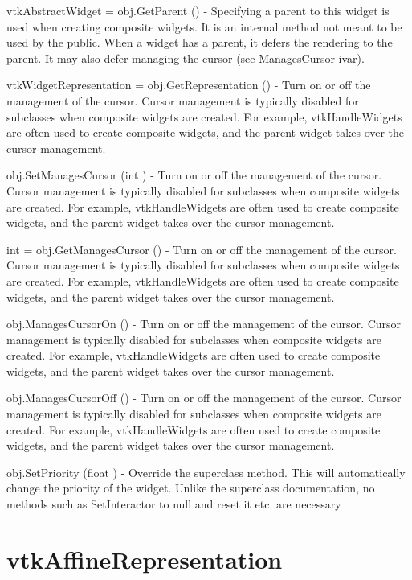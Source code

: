 \begin{DoxyItemize}
\item {\ttfamily vtk\-Abstract\-Widget = obj.\-Get\-Parent ()} -\/ Specifying a parent to this widget is used when creating composite widgets. It is an internal method not meant to be used by the public. When a widget has a parent, it defers the rendering to the parent. It may also defer managing the cursor (see Manages\-Cursor ivar).  
\item {\ttfamily vtk\-Widget\-Representation = obj.\-Get\-Representation ()} -\/ Turn on or off the management of the cursor. Cursor management is typically disabled for subclasses when composite widgets are created. For example, vtk\-Handle\-Widgets are often used to create composite widgets, and the parent widget takes over the cursor management.  
\item {\ttfamily obj.\-Set\-Manages\-Cursor (int )} -\/ Turn on or off the management of the cursor. Cursor management is typically disabled for subclasses when composite widgets are created. For example, vtk\-Handle\-Widgets are often used to create composite widgets, and the parent widget takes over the cursor management.  
\item {\ttfamily int = obj.\-Get\-Manages\-Cursor ()} -\/ Turn on or off the management of the cursor. Cursor management is typically disabled for subclasses when composite widgets are created. For example, vtk\-Handle\-Widgets are often used to create composite widgets, and the parent widget takes over the cursor management.  
\item {\ttfamily obj.\-Manages\-Cursor\-On ()} -\/ Turn on or off the management of the cursor. Cursor management is typically disabled for subclasses when composite widgets are created. For example, vtk\-Handle\-Widgets are often used to create composite widgets, and the parent widget takes over the cursor management.  
\item {\ttfamily obj.\-Manages\-Cursor\-Off ()} -\/ Turn on or off the management of the cursor. Cursor management is typically disabled for subclasses when composite widgets are created. For example, vtk\-Handle\-Widgets are often used to create composite widgets, and the parent widget takes over the cursor management.  
\item {\ttfamily obj.\-Set\-Priority (float )} -\/ Override the superclass method. This will automatically change the priority of the widget. Unlike the superclass documentation, no methods such as Set\-Interactor to null and reset it etc. are necessary  
\end{DoxyItemize}\hypertarget{vtkwidgets_vtkaffinerepresentation}{}\section{vtk\-Affine\-Representation}\label{vtkwidgets_vtkaffinerepresentation}
